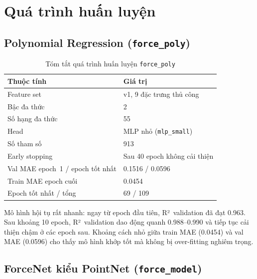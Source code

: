 \section{Quá trình huấn luyện}
\label{sec:training_curves}

\subsection{Polynomial Regression (\texttt{force\_poly})}

\begin{table}[h]
\centering
\caption{Tóm tắt quá trình huấn luyện \texttt{force\_poly}}
\label{tab:train_poly}
\begin{tabular}{ll}
\toprule
\textbf{Thuộc tính} & \textbf{Giá trị} \\
\midrule
Feature set & v1, 9 đặc trưng thủ công \\
Bậc đa thức & 2 \\
Số hạng đa thức & 55 \\
Head & MLP nhỏ (\texttt{mlp\_small}) \\
Số tham số & 913 \\
Early stopping & Sau 40 epoch không cải thiện \\
Val MAE epoch~1 / epoch tốt nhất & 0.1516 / 0.0596 \\
Train MAE epoch cuối & 0.0454 \\
Epoch tốt nhất / tổng & 69 / 109 \\
\bottomrule
\end{tabular}
\end{table}

Mô hình hội tụ rất nhanh: ngay từ epoch đầu tiên, R²~validation đã đạt
0.963. Sau khoảng 10 epoch, R²~validation dao động quanh 0.988--0.990 và
tiếp tục cải thiện chậm ở các epoch sau. Khoảng cách nhỏ giữa train MAE
(0.0454) và val MAE (0.0596) cho thấy mô hình khớp tốt mà không bị
over-fitting nghiêm trọng.

\subsection{ForceNet kiểu PointNet (\texttt{force\_model})}

